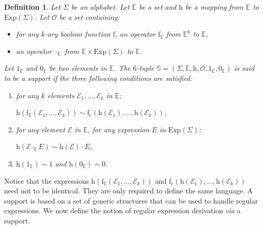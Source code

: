 \documentclass{article}
\newtheorem{definition}{Definition}
\begin{document}
  
  \begin{definition}\label{def support}
    Let $\Sigma$ be an alphabet. Let $\mathbb{E}$ be a set and $\mathrm{h}$ be a mapping from $\mathbb{E}$ to $\mathrm{Exp}(\Sigma)$. Let $\mathcal{O}$ be a set containing:
    \begin{itemize}
      \item for any $k$-ary boolean function $\mathrm{f}$, an operator $\mathrm{f}_{\mathbb{E}}$ from $\mathbb{E}^k$ to $\mathbb{E}$,
      \item an operator $\cdot_\mathbb{E}$ from $\mathbb{E}\times \mathrm{Exp}(\Sigma)$ to $\mathbb{E}$.
    \end{itemize}
    Let $1_\mathbb{E}$ and $0_\mathbb{E}$ be two elements in $\mathbb{E}$. The $6$-tuple $\mathbb{S}=(\Sigma,\mathbb{E},\mathrm{h},\mathcal{O},1_\mathbb{E},0_\mathbb{E})$ is said to be a \emph{support} if the three following conditions are satisfied:
    \begin{enumerate}
      \item for any $k$ elements $\mathcal{E}_1,\ldots,\mathcal{E}_k$ in $\mathbb{E}$:
    
      \centerline{
        $\mathrm{h}(\mathrm{f}_{\mathbb{E}}(\mathcal{E}_1,\ldots,\mathcal{E}_k)) \sim \mathrm{f}_e(\mathrm{h}(\mathcal{E}_1),\ldots,\mathrm{h}(\mathcal{E}_k))$,
      }
    
      \item for any element $\mathcal{E}$ in $\mathbb{E}$, for any expression $E$ in $\mathrm{Exp}(\Sigma)$:
    
      \centerline{
        $\mathrm{h}(\mathcal{E} \cdot_{\mathbb{E}} E ) \sim \mathrm{h}(\mathcal{E})\cdot E$,
      }
      
      \item $\mathrm{h}(1_\mathbb{E})\sim 1$ and $\mathrm{h}(0_\mathbb{E})\sim 0$.
    \end{enumerate}
  \end{definition}
  
  Notice that the expressions $\mathrm{h}(\mathrm{f}_{\mathbb{E}}(\mathcal{E}_1,\ldots,\mathcal{E}_k))$ and $\mathrm{f}_e(\mathrm{h}(\mathcal{E}_1),\ldots,\mathrm{h}(\mathcal{E}_k))$ need not to be identical. They are only required to define the same language.  
A support is based on a set of generic structures that can be used to handle regular expressions. We now define the notion of regular expression derivation \emph{via} a support.
  
\end{document}
